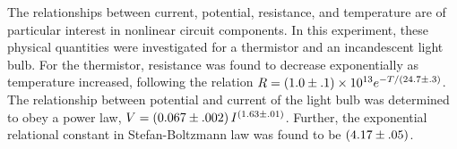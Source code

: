
\physics

\begin{paperabs}
	The relationships between current, potential, resistance, and temperature are of particular interest in nonlinear circuit components. In this experiment, these physical quantities were investigated for a thermistor and an incandescent light bulb. For the thermistor, resistance was found to decrease exponentially as temperature increased, following the relation \( R = \left(1.0 \pm .1\right) \times 10^{13}e^{-T/\left(24.7 \pm .3\right)} \). The relationship between potential and current of the light bulb was determined to obey a power law, \( V = \left(0.067 \pm .002\right) I^{\left(1.63 \pm .01\right)} \). Further, the exponential relational constant in Stefan-Boltzmann law was found to be $\left(4.17\pm.05\right)$. 
	
\end{paperabs}

